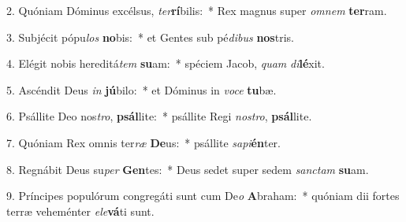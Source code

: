 2. Quóniam Dóminus excélsus, \textit{ter}\textbf{rí}bilis:~*  Rex magnus super \textit{om}\textit{nem} \textbf{ter}ram.\

3. Subjécit pópu\textit{los} \textbf{no}bis:~*  et Gentes sub pé\textit{di}\textit{bus} \textbf{nos}tris.\

4. Elégit nobis hereditá\textit{tem} \textbf{su}am:~*  spéciem Jacob, \textit{quam} \textit{di}\textbf{lé}xit.\

5. Ascéndit Deus \textit{in} \textbf{jú}bilo:~*  et Dóminus in \textit{vo}\textit{ce} \textbf{tu}bæ.\

6. Psállite Deo nos\textit{tro}, \textbf{psál}lite:~*  psállite Regi \textit{nos}\textit{tro}, \textbf{psál}lite.\

7. Quóniam Rex omnis ter\textit{ræ} \textbf{De}us:~*  psállite \textit{sa}\textit{pi}\textbf{én}ter.\

8. Regnábit Deus su\textit{per} \textbf{Gen}tes:~*  Deus sedet super sedem \textit{sanc}\textit{tam} \textbf{su}am.\

9. Príncipes populórum congregáti sunt cum De\textit{o} \textbf{A}braham:~*  quóniam dii fortes terræ veheménter \textit{e}\textit{le}\textbf{vá}ti sunt.\

